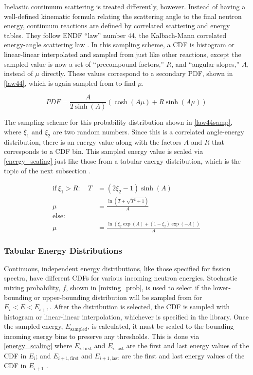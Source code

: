 Inelastic continuum scattering is treated differently, however.  Instead of having a well-defined kinematic formula relating the scattering angle to the final neutron energy, continuum reactions are defined by correlated scattering and energy tables.  They follow ENDF ``law'' number 44, the Kalbach-Mann correlated energy-angle scattering law \cite{mcnp} \cite{openmc}.  In this sampling scheme, a CDF is histogram or linear-linear interpolated and sampled from just like other reactions, except the sampled value is now a set of ``precompound factors,'' $R$, and ``angular slopes,'' $A$, instead of $\mu$ directly.  These values correspond to a secondary PDF, shown in \eqref{law44}, which is again sampled from to find $\mu$.

\begin{equation}
\label{law44}
PDF = \frac{A}{2 \sinh (A)} ( \cosh(A\mu)+R \sinh (A\mu))
\end{equation}

The sampling scheme for this probability distribution shown in \eqref{law44samp}, where $\xi_1$ and $\xi_2$ are two random numbers.  Since this is a correlated angle-energy distribution, there is an energy value along with the factors $A$ and $R$ that corresponds to a CDF bin.  This sampled energy value is scaled via \eqref{energy_scaling} just like those from a tabular energy distribution, which is the topic of the next subsection \cite{3rdsampler}\cite{openmc}.

\begin{equation}
\label{law44samp}
\begin{split}
\mathrm{if} \: \xi_1 > R:  \quad T&=(2\xi_2-1)\sinh(A)\\
\mu &= \frac{\ln(T+\sqrt{T^2+1})}{A}\\
\mathrm{else: }  \qquad & \\
\mu &= \frac{ \ln(\xi_2 \exp(A) + (1-\xi_2)\exp(-A))}{A}
\end{split}
\end{equation}

\subsubsection{Tabular Energy Distributions}

Continuous, independent energy distributions, like those specified for fission spectra, have different CDFs for various incoming neutron energies.  Stochastic mixing probability, $f$, shown in \eqref{mixing_prob}, is used to select if the lower-bounding or upper-bounding distribution will be sampled from for $E_i < E < E_{i+1}$.  After the distribution is selected, the CDF is sampled with histogram or linear-linear interpolation, whichever is specified in the library.  Once the sampled energy, $E_\mathrm{sampled}$, is calculated, it must be scaled to the bounding incoming energy bins to preserve any thresholds.  This is done via \eqref{energy_scaling} where $E_{i,\mathrm{first}}$ and $E_{i,\mathrm{last}}$ are the first and last energy values of the CDF in $E_i$; and $E_{i+1,\mathrm{first}}$ and $E_{i+1,\mathrm{last}}$ are the first and last energy values of the CDF in $E_{i+1}$ \cite{mcnp}.

